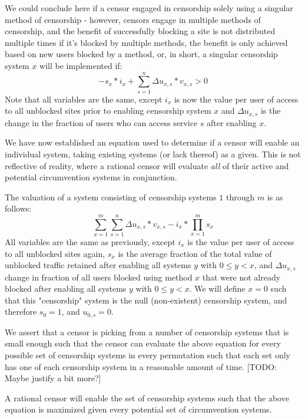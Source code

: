 \documentclass[12pt]{report}
\begin{document}
We could conclude here if a censor engaged in censorship solely using a singular method of censorship - however, censors engage in multiple methods of censorship, and the benefit of successfully blocking a site is not distributed multiple times if it's blocked by multiple methods, the benefit is only achieved based on new users blocked by a method, or, in short, a singular censorship system $x$ will be implemented if:
\begin{equation}
-s_x*i_x + \sum_{s=1}^{n}\Delta u_{x,s}*v_{x,s} > 0
\end{equation}
Note that all variables are the same, except $i_x$ is now the value per user of access to all unblocked sites prior to enabling censorship system $x$ and $\Delta u_{x,s}$ is the change in the fraction of users who can access service $s$ after enabling $x$.

We have now established an equation used to determine if a censor will enable an individual system, taking existing systems (or lack thereof) as a given. This is not reflective of reality, where a rational censor will evaluate \emph{all} of their active and potential circumvention systems in conjunction.

The valuation of a system consisting of censorship systems $1$ through $m$ is as follows:
\begin{equation}
\sum_{x=1}^{m}\sum_{s=1}^{n}\Delta u_{x,s}*v_{x,s} - i_{x} * \prod_{x=1}^{m}s_x
\end{equation}
All variables are the same as previously, except $i_x$ is the value per user of access to all unblocked sites again, $s_x$ is the average fraction of the total value of unblocked traffic retained after enabling all systems $y$ with $0\leq y<x$, and $\Delta  u_{x,s}$ change in fraction of all users blocked using method $x$ that were not already blocked after enabling all systems $y$ with $0\leq y<x$. We will define $x=0$ such that this "censorship" system is the null (non-existent) censorship system, and therefore $s_0 = 1$, and $u_{0,s} = 0$.

We assert that a censor is picking from a number of censorship systems that is small enough such that the censor can evaluate the above equation for every possible set of censorship systems in every permutation such that each set only has one of each censorship system in a reasonable amount of time. [TODO: Maybe justify a bit more?]

A rational censor will enable the set of censorship systems such that the above equation is maximized given every potential set of circumvention systems.
\end{document}
